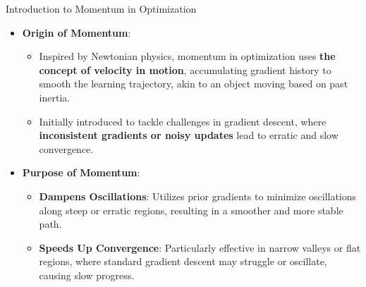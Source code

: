 \documentclass[serif, aspectratio=169]{beamer}
\begin{document}
\begin{frame}{Introduction to Momentum in Optimization}
    \begin{itemize}
        \item \textbf{Origin of Momentum}: 
        \begin{itemize}
            \item Inspired by Newtonian physics, momentum in optimization uses \textbf{the concept of velocity in motion}, accumulating gradient history to smooth the learning trajectory, akin to an object moving based on past inertia.
            \item Initially introduced to tackle challenges in gradient descent, where \textbf{inconsistent gradients or noisy updates} lead to erratic and slow convergence.
        \end{itemize}
        
        \item \textbf{Purpose of Momentum}: 
        \begin{itemize}
            \item \textbf{Dampens Oscillations}: Utilizes prior gradients to minimize oscillations along steep or erratic regions, resulting in a smoother and more stable path.
            \item \textbf{Speeds Up Convergence}: Particularly effective in narrow valleys or flat regions, where standard gradient descent may struggle or oscillate, causing slow progress.
        \end{itemize}
        
    \end{itemize}
\end{frame}

\end{document}
